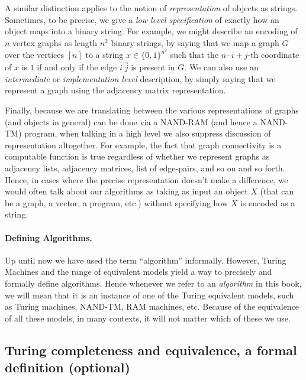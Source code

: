 A similar distinction applies to the notion of \emph{representation} of
objects as strings. Sometimes, to be precise, we give a \emph{low level
specification} of exactly how an object maps into a binary string. For
example, we might describe an encoding of \(n\) vertex graphs as length
\(n^2\) binary strings, by saying that we map a graph \(G\) over the
vertices \([n]\) to a string \(x\in \{0,1\}^{n^2}\) such that the
\(n\cdot i + j\)-th coordinate of \(x\) is \(1\) if and only if the edge
\(\overrightarrow{i \; j}\) is present in \(G\). We can also use an
\emph{intermediate} or \emph{implementation level} description, by
simply saying that we represent a graph using the adjacency matrix
representation.

Finally, because we are translating between the various representations
of graphs (and objects in general) can be done via a NAND-RAM (and hence
a NAND-TM) program, when talking in a high level we also suppress
discussion of representation altogether. For example, the fact that
graph connectivity is a computable function is true regardless of
whether we represent graphs as adjacency lists, adjacency matrices, list
of edge-pairs, and so on and so forth. Hence, in cases where the precise
representation doesn't make a difference, we would often talk about our
algorithms as taking as input an object \(X\) (that can be a graph, a
vector, a program, etc.) without specifying how \(X\) is encoded as a
string.

\paragraph{Defining Algorithms.} Up until now we have used the term
``algorithm'' informally. However, Turing Machines and the range of
equivalent models yield a way to precisely and formally define
algorithms. Hence whenever we refer to an \emph{algorithm} in this book,
we will mean that it is an instance of one of the Turing equivalent
models, such as Turing machines, NAND-TM, RAM machines, etc. Because of
the equivalence of all these models, in many contexts, it will not
matter which of these we use.

\subsection{Turing completeness and equivalence, a formal definition
(optional)}\label{turingcompletesec}

